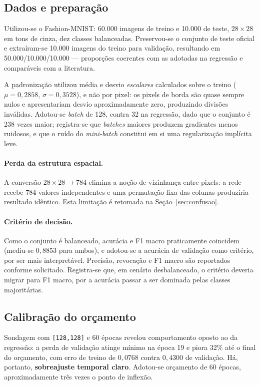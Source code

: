 \documentclass[11pt,a4paper]{article}
\begin{document}
\subsection{Dados e preparação}

Utilizou-se o Fashion-MNIST: 60.000 imagens de treino e 10.000 de teste, $28\times28$
em tons de cinza, dez classes balanceadas. Preservou-se o conjunto de teste oficial e
extraíram-se 10.000 imagens do treino para validação, resultando em 50.000/10.000/10.000
--- proporções coerentes com as adotadas na regressão e comparáveis com a literatura.

A padronização utilizou média e desvio \emph{escalares} calculados sobre o treino
($\mu = 0{,}2858$, $\sigma = 0{,}3528$), e não por pixel: os pixels de borda são quase
sempre nulos e apresentariam desvio aproximadamente zero, produzindo divisões inválidas.
Adotou-se \emph{batch} de 128, contra 32 na regressão, dado que o conjunto é 238 vezes
maior; registra-se que \emph{batches} maiores produzem gradientes menos ruidosos, e que
o ruído do \emph{mini-batch} constitui em si uma regularização implícita leve.

\paragraph{Perda da estrutura espacial.} A conversão $28\times28 \to 784$ elimina a
noção de vizinhança entre pixels: a rede recebe 784 valores independentes e uma
permutação fixa das colunas produziria resultado idêntico. Esta limitação é retomada na
Seção~\ref{sec:confusao}.

\paragraph{Critério de decisão.} Como o conjunto é balanceado, acurácia e F1 macro
praticamente coincidem (mediu-se $0{,}8853$ para ambos), e adotou-se a acurácia de
validação como critério, por ser mais interpretável. Precisão, revocação e F1 macro são
reportados conforme solicitado. Registra-se que, em cenário desbalanceado, o critério
deveria migrar para F1 macro, por a acurácia passar a ser dominada pelas classes
majoritárias.

\subsection{Calibração do orçamento}
\label{sec:clf-orcamento}

Sondagem com \texttt{[128,128]} e 60 épocas revelou comportamento oposto ao da
regressão: a perda de validação atinge mínimo na época 19 e piora 32\% até o final do
orçamento, com erro de treino de $0{,}0768$ contra $0{,}4300$ de validação. Há, portanto,
\textbf{sobreajuste temporal claro}. Adotou-se orçamento de 60 épocas, aproximadamente
três vezes o ponto de inflexão.
\end{document}
